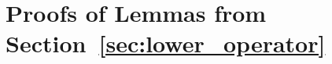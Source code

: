 \documentclass[10pt]{paper}
\theoremstyle{definition}
\newtheorem{theorem}{Theorem}
\newcommand{\reals}{\mathbb{R}}
\newcommand{\realsnonneg}{\reals_{\geq 0}}
\newcommand{\states}{\mathcal{X}}
\newcommand{\gambles}{\mathcal{L}}
\newcommand{\lrate}{\underline{Q}}
\newcommand{\coloneqq}{:\!=}
\begin{document}
%


 


\appendix

\section{Proofs of Lemmas from Section~\ref{sec:lower_operator}}\label{sec:proof_appendix}
\end{document}
